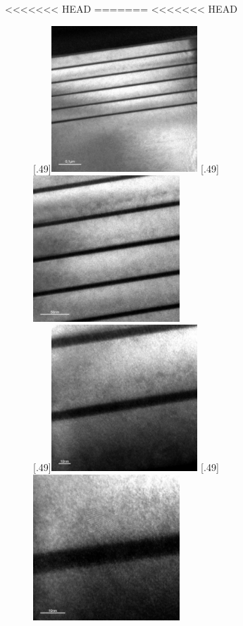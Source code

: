 \documentclass[a4paper,11pt,DIV=11]{scrartcl}
\begin{document}
<<<<<<< HEAD
=======
<<<<<<< HEAD
\begin{figure}[htb]\centering
	[.49\linewidth]{\includegraphics[width=0.49\textwidth]{Versuchsdaten/11/34000x.jpg}}
	[.49\linewidth]{\includegraphics[width=0.49\textwidth]{Versuchsdaten/11/87000x.jpg}}\\
	[.49\linewidth]{\includegraphics[width=0.49\textwidth]{Versuchsdaten/11/185000x.jpg}}
	[.49\linewidth]{\includegraphics[width=0.49\textwidth]{Versuchsdaten/11/380000x.jpg}}

\end{figure}
\end{document}
